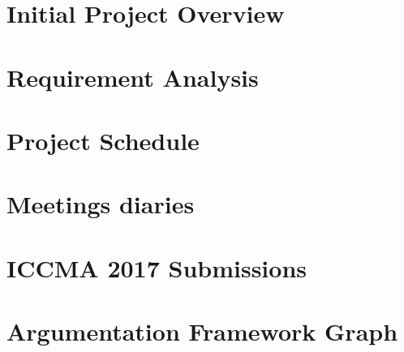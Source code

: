 \documentclass[12pt,a4paper]{report}
\theoremstyle{definition}
\begin{document}
\newpage
\begin{appendices}
\chapter{Initial Project Overview}
\label{appendix:IPO}


\chapter{Requirement Analysis} 
\label{appendix:requirementAnalysis}


\chapter{Project Schedule}
\label{appendix:projectSchedule}


\chapter{Meetings diaries}
\label{appendix:diaries}


\chapter{ICCMA 2017 Submissions}
\label{appendix:ICCMASubmissions}


\chapter{Argumentation Framework Graph}
\label{appendix:aficcma}





\end{appendices}
\end{document}
